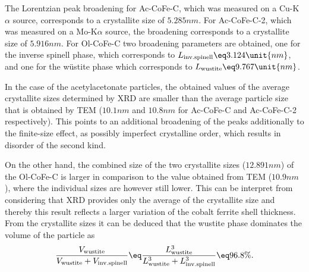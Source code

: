 \documentclass[\main/dresen_thesis.tex]{subfiles}
\begin{document}
    The Lorentzian peak broadening for Ac-CoFe-C, which was measured on a Cu-K$\alpha$ source, corresponds to a crystallite size of $5.285 \unit{nm}$.
    For Ac-CoFe-C-2, which was measured on a Mo-K$\alpha$ source, the broadening corresponds to a crystallite size of $5.916 \unit{nm}$.
    For Ol-CoFe-C two broadening parameters are obtained, one for the inverse spinell phase, which corresponds to $L_{\mathrm{inv. spinell}} \eq 3.124 \unit{nm}$, and one for the w\"ustite phase which corresponds to $L_{\mathrm{wustite}} \eq 9.767 \unit{nm}$.

    In the case of the acetylacetonate particles, the obtained values of the average crystallite sizes determined by XRD are smaller than the average particle size that is obtained by TEM ($10.1 \unit{nm}$ and $10.8 \unit{nm}$ for Ac-CoFe-C and Ac-CoFe-C-2 respectively).
    This points to an additional broadening of the peaks additionally to the finite-size effect, as possibly imperfect crystalline order, which results in disorder of the second kind.

    On the other hand, the combined size of the two crystallite sizes ($12.891 \unit{nm}$) of the Ol-CoFe-C is larger in comparison to the value obtained from TEM ($10.9 \unit{nm}$), where the individual sizes are however still lower.
    This can be interpret from considering that XRD provides only the average of the crystallite size and thereby this result reflects a larger variation of the cobalt ferrite shell thickness.
    From the crystallite sizes it can be deduced that the wustite phase dominates the volume of the particle as
    \begin{align}
      \frac{V_{\mathrm{wustite}}}{V_{\mathrm{wustite}} + V_{\mathrm{inv. spinell}}} \eq \frac{L^3_{\mathrm{wustite}}}{ L^3_{\mathrm{wustite}} + L^3_{\mathrm{inv. spinell}}} \eq 96.8 \%.
    \end{align}
\end{document}
